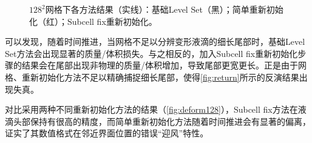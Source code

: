 \documentclass[11pt]{article}
\begin{document}
\begin{figure}[h]
    \centering
    \caption{\label{fig:deform128}$128^2$网格下各方法结果（实线）：基础Level Set（黑）；简单重新初始化（红）；Subcell fix重新初始化。}
\end{figure}

可以发现，随着时间推进，当网格不足以分辨变形液滴的细长尾部时，基础Level Set方法会出现显著的质量/体积损失。与之相反的，加入Subcell fix重新初始化步骤的结果会在尾部出现非物理的质量/体积增加，导致尾部更宽更长。正是由于网格、重新初始化方法不足以精确捕捉细长尾部，使得\autoref{fig:return}所示的反演结果出现失真。

对比采用两种不同重新初始化方法的结果（\autoref{fig:deform128}），Subcell fix方法在液滴头部保持有很高的精度，而简单重新初始化方法随着时间推进会有显著的偏离，证实了其数值格式在邻近界面位置的错误“迎风”特性。


\newpage


\end{document}

